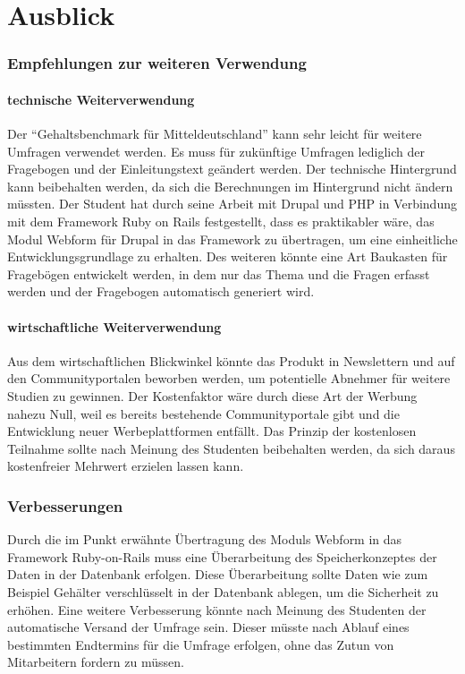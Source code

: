 \part{Ausblick}
\section{Empfehlungen zur weiteren Verwendung}
\subsection{technische Weiterverwendung}
\label{sec:ausblick_technik}
Der ``Gehaltsbenchmark für Mitteldeutschland'' kann sehr leicht für weitere Umfragen verwendet werden. Es muss für zukünftige Umfragen lediglich der Fragebogen und der Einleitungstext geändert werden.
Der technische Hintergrund kann beibehalten werden, da sich die Berechnungen im Hintergrund nicht ändern müssten. Der Student hat durch seine Arbeit mit Drupal und PHP in Verbindung mit dem Framework Ruby on Rails festgestellt, dass es praktikabler wäre, das Modul Webform für Drupal in das Framework zu übertragen, um eine einheitliche Entwicklungsgrundlage zu erhalten. Des weiteren könnte eine Art Baukasten für Fragebögen entwickelt werden, in dem nur das Thema und die Fragen erfasst werden und der Fragebogen automatisch generiert wird. 
\subsection{wirtschaftliche Weiterverwendung}
Aus dem wirtschaftlichen Blickwinkel könnte das Produkt in Newslettern und auf den Communityportalen beworben werden, um potentielle Abnehmer für weitere Studien zu gewinnen. Der Kostenfaktor wäre durch diese Art der Werbung nahezu Null, weil es bereits bestehende Communityportale gibt und die Entwicklung neuer Werbeplattformen entfällt. Das Prinzip der kostenlosen Teilnahme sollte nach Meinung des Studenten beibehalten werden, da sich daraus kostenfreier Mehrwert erzielen lassen kann. 
\section{Verbesserungen}
Durch die im Punkt  erwähnte Übertragung des Moduls Webform in das Framework Ruby-on-Rails muss eine Überarbeitung des Speicherkonzeptes der Daten in der Datenbank erfolgen. Diese Überarbeitung sollte Daten wie zum Beispiel Gehälter verschlüsselt in der Datenbank ablegen, um die Sicherheit zu erhöhen. Eine weitere Verbesserung könnte nach Meinung des Studenten der automatische Versand der Umfrage sein. Dieser müsste nach Ablauf eines bestimmten Endtermins für die Umfrage erfolgen, ohne das Zutun von Mitarbeitern fordern zu müssen.
